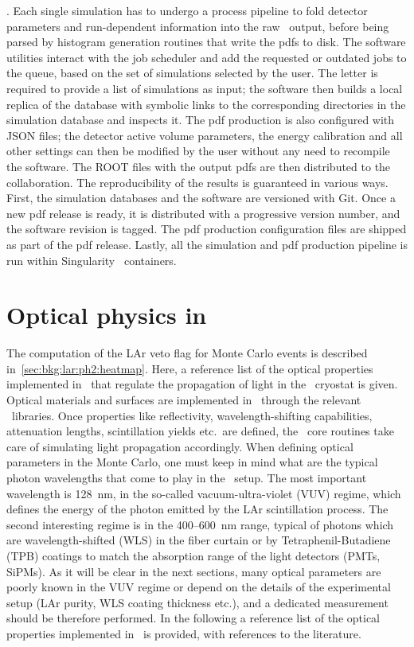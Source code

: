 $${}. Each single simulation has to undergo a process pipeline to fold detector parameters
and run-dependent information into the raw \mage\ output, before being parsed by histogram
generation routines that write the pdfs to disk. The software utilities interact with the
job scheduler and add the requested or outdated jobs to the queue, based on the set of
simulations selected by the user. The letter is required to provide a list of simulations
as input; the software then builds a local replica of the database with symbolic links to
the corresponding directories in the simulation database and inspects it. The pdf
production is also configured with JSON files; the detector active volume parameters, the
energy calibration and all other settings can then be modified by the user without any
need to recompile the software. The ROOT files with the output pdfs are then distributed
to the collaboration.
\newpar
The reproducibility of the results is guaranteed in various ways. First, the simulation
databases and the software are versioned with Git. Once a new pdf release is ready, it is
distributed with a progressive version number, and the software revision is tagged. The
pdf production configuration files are shipped as part of the pdf release. Lastly, all the
simulation and pdf production pipeline is run within Singularity~\cite{Kurtzer2017,
Singularity2020} containers.

\section{Optical physics in \mage}%
\label{sec:apdx:mage-optics}

The computation of the LAr veto flag for Monte Carlo events is described
in~\cref{sec:bkg:lar:ph2:heatmap}. Here, a reference list of the optical properties
implemented in \mage\ that regulate the propagation of light in the \gerda\ cryostat is
given.
\newpar
Optical materials and surfaces are implemented in \mage\ through the relevant \geant\
libraries. Once properties like reflectivity, wavelength-shifting capabilities,
attenuation lengths, scintillation yields etc.~are defined, the \geant\ core routines take
care of simulating light propagation accordingly. When defining optical parameters in the
Monte Carlo, one must keep in mind what are the typical photon wavelengths that come to
play in the \gerda\ setup. The most important wavelength is 128~nm, in the so-called
vacuum-ultra-violet (VUV) regime, which defines the energy of the photon emitted by the
LAr scintillation process. The second interesting regime is in the 400--600~nm range,
typical of photons which are wavelength-shifted (WLS) in the fiber curtain or by
Tetraphenil-Butadiene (TPB) coatings to match the absorption range of the light detectors
(PMTs, SiPMs). As it will be clear in the next sections, many optical parameters are
poorly known in the VUV regime or depend on the details of the experimental setup (LAr
purity, WLS coating thickness etc.), and a dedicated measurement should be therefore
performed. In the following a reference list of the optical properties implemented in
\mage\ is provided, with references to the literature.

